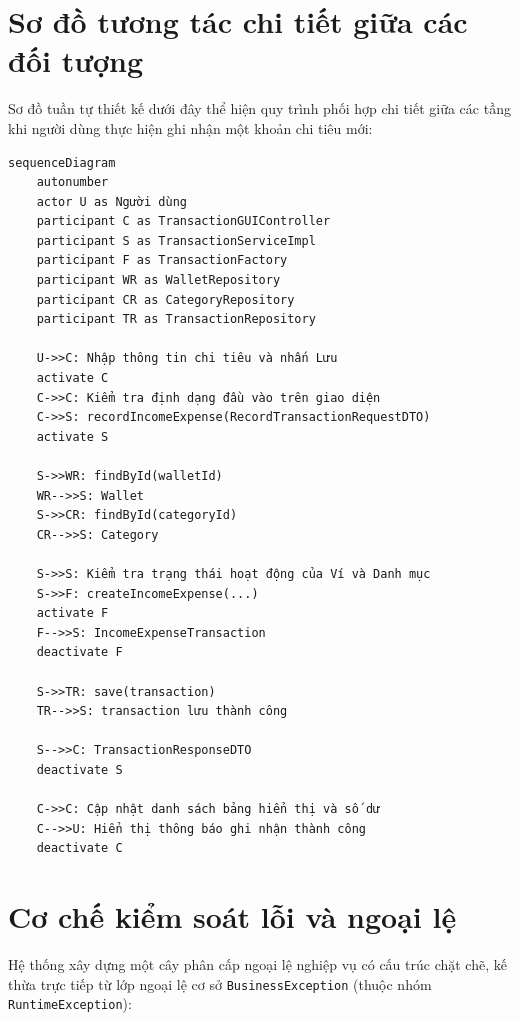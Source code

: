 \documentclass[a4paper,12pt]{report}
\newcommand{\passthrough}[1]{#1}
\begin{document}
\section{Sơ đồ tương tác chi tiết giữa các đối
tượng}\label{sux1a1-ux111ux1ed3-tux1b0ux1a1ng-tuxe1c-chi-tiux1ebft-giux1eefa-cuxe1c-ux111ux1ed1i-tux1b0ux1ee3ng}

Sơ đồ tuần tự thiết kế dưới đây thể hiện quy trình phối hợp chi tiết
giữa các tầng khi người dùng thực hiện ghi nhận một khoản chi tiêu mới:

\begin{lstlisting}
sequenceDiagram
    autonumber
    actor U as Người dùng
    participant C as TransactionGUIController
    participant S as TransactionServiceImpl
    participant F as TransactionFactory
    participant WR as WalletRepository
    participant CR as CategoryRepository
    participant TR as TransactionRepository

    U->>C: Nhập thông tin chi tiêu và nhấn Lưu
    activate C
    C->>C: Kiểm tra định dạng đầu vào trên giao diện
    C->>S: recordIncomeExpense(RecordTransactionRequestDTO)
    activate S

    S->>WR: findById(walletId)
    WR-->>S: Wallet
    S->>CR: findById(categoryId)
    CR-->>S: Category

    S->>S: Kiểm tra trạng thái hoạt động của Ví và Danh mục
    S->>F: createIncomeExpense(...)
    activate F
    F-->>S: IncomeExpenseTransaction
    deactivate F

    S->>TR: save(transaction)
    TR-->>S: transaction lưu thành công

    S-->>C: TransactionResponseDTO
    deactivate S

    C->>C: Cập nhật danh sách bảng hiển thị và số dư
    C-->>U: Hiển thị thông báo ghi nhận thành công
    deactivate C
\end{lstlisting}

\section{Cơ chế kiểm soát lỗi và ngoại
lệ}\label{cux1a1-chux1ebf-kiux1ec3m-souxe1t-lux1ed7i-vuxe0-ngoux1ea1i-lux1ec7}

Hệ thống xây dựng một cây phân cấp ngoại lệ nghiệp vụ có cấu trúc chặt
chẽ, kế thừa trực tiếp từ lớp ngoại lệ cơ sở
\passthrough{\lstinline!BusinessException!} (thuộc nhóm
\passthrough{\lstinline!RuntimeException!}):
\end{document}
